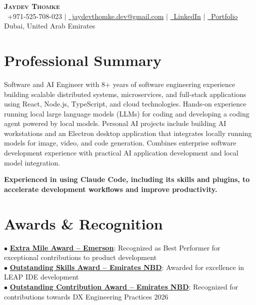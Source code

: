 \documentclass[letterpaper,12pt]{article}
\begin{document}
\begin{center}
    \textbf{\Huge \scshape Jaydev Thomke} \\ \vspace{2pt}
    \small \faPhone\ +971-525-708-023 $|$ 
    \href{mailto:jaydevthomke.dev@gmail.com}{\faEnvelope\ jaydevthomke.dev@gmail.com} $|$ 
    \href{https://linkedin.com/in/jaydev-thomke-730924136}{\faLinkedin\ LinkedIn} $|$
    \href{https://jaydev25.github.io/resume/}{\faGlobe\ Portfolio} \\
    \small Dubai, United Arab Emirates
\end{center}

\section{Professional Summary}
\small{Software and AI Engineer with 8+ years of software engineering experience building scalable distributed systems, microservices, and full-stack applications using React, Node.js, TypeScript, and cloud technologies. Hands-on experience running local large language models (LLMs) for coding and developing a coding agent powered by local models. Personal AI projects include building AI workstations and an Electron desktop application that integrates locally running models for image, video, and code generation. Combines enterprise software development experience with practical AI application development and local model integration.}

\vspace{4pt}
\small{\textbf{Experienced in using Claude Code, including its skills and plugins, to accelerate development workflows and improve productivity.}}

\section{Awards \& Recognition}
 \begin{itemize}[leftmargin=0.15in, label={}]
    \small{\item{
     $\bullet$ \textbf{\href{https://www.linkedin.com/posts/activity-7278264293890940929-Wyra/}{Extra Mile Award -- Emerson}}{: Recognized as Best Performer for exceptional contributions to product development} \\
     $\bullet$ \textbf{\href{https://www.linkedin.com/posts/activity-7378828158617157633-18Ze/}{Outstanding Skills Award -- Emirates NBD}}{: Awarded for excellence in LEAP IDE development} \\
     $\bullet$ \textbf{\href{https://www.linkedin.com/posts/activity-7446961085615726592-HPTA/}{Outstanding Contribution Award -- Emirates NBD}}{: Recognized for contributions towards DX Engineering Practices 2026} \\
    }}
 \end{itemize}
\end{document}
